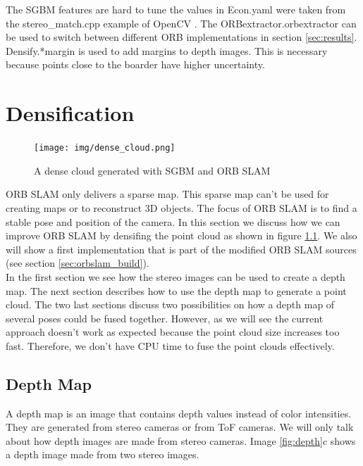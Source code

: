 \documentclass[11pt,a4paper,titlepage,oneside]{report}
\begin{document}
The SGBM features are hard to tune the values in Econ.yaml were taken from the stereo\_match.cpp example of OpenCV \cite{opencv_se}. The ORBextractor.orbextractor can be used to switch between different ORB implementations in section \ref{sec:results}. Densify.*margin is used to add margins to depth images. This is necessary because points close to the boarder have higher uncertainty.

\chapter{Densification}

\begin{figure}[H]
  \begin{center}
		\texttt{[image: img/dense\_cloud.png]}
  \end{center}
	\caption{A dense cloud generated with SGBM and ORB SLAM}\label{fig:dense_cloud}
\end{figure}

ORB SLAM only delivers a sparse map. This sparse map can't be used for creating maps or to reconstruct 3D objects. The focus of ORB SLAM is to find a stable pose and position of the camera. In this section we discuss how we can improve ORB SLAM by densifing the point cloud as shown in figure \ref{fig:dense_cloud}. We also will show a first implementation that is part of the modified ORB SLAM sources (see section \ref{sec:orbslam_build}).\\
In the first section we see how the stereo images can be used to create a depth map. The next section describes how to use the depth map to generate a point cloud. The two last sections discuss two possibilities on how a depth map of several poses could be fused together. However, as we will see the current approach doesn't work as expected because the point cloud size increases too fast. Therefore, we don't have CPU time to fuse the point clouds effectively.

\section{Depth Map}

A depth map is an image that contains depth values instead of color intensities. They are generated from stereo cameras or from ToF cameras. We will only talk about how depth images are made from stereo cameras. Image \ref{fig:depth}c shows a depth image made from two stereo images.
\end{document}
